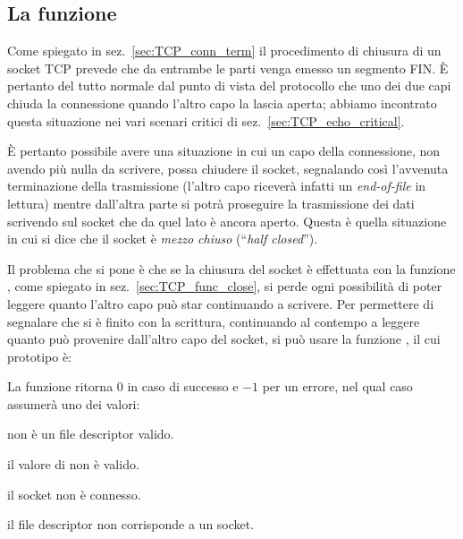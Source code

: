 \subsection{La funzione }
\label{sec:TCP_shutdown}

Come spiegato in sez.~\ref{sec:TCP_conn_term} il procedimento di chiusura di
un socket TCP prevede che da entrambe le parti venga emesso un segmento FIN. È
pertanto del tutto normale dal punto di vista del protocollo che uno dei due
capi chiuda la connessione quando l'altro capo la lascia aperta; abbiamo
incontrato questa situazione nei vari scenari critici di
sez.~\ref{sec:TCP_echo_critical}.


È pertanto possibile avere una situazione in cui un capo della connessione,
non avendo più nulla da scrivere, possa chiudere il socket, segnalando così
l'avvenuta terminazione della trasmissione (l'altro capo riceverà infatti un
\textit{end-of-file} in lettura) mentre dall'altra parte si potrà proseguire
la trasmissione dei dati scrivendo sul socket che da quel lato è ancora
aperto.  Questa è quella situazione in cui si dice che il socket è
\textsl{mezzo chiuso} (``\textit{half closed}'').

Il problema che si pone è che se la chiusura del socket è effettuata con la
funzione , come spiegato in sez.~\ref{sec:TCP_func_close}, si
perde ogni possibilità di poter leggere quanto l'altro capo può star
continuando a scrivere. Per permettere di segnalare che si è finito con la
scrittura, continuando al contempo a leggere quanto può provenire dall'altro
capo del socket, si può usare la funzione , il cui prototipo
è:

\begin{funcproto}{
}

{La funzione ritorna $0$ in caso di successo e $-1$ per un errore, nel qual
  caso  assumerà uno dei valori: 
  \begin{errlist}
  \item[\errcode{EBADF}]  non è un file descriptor valido.
  \item[\errcode{EINVAL}] il valore di  non è valido.
  \item[\errcode{ENOTCONN}] il socket non è connesso.
  \item[\errcode{ENOTSOCK}] il file descriptor non corrisponde a un socket.
  \end{errlist}}
\end{funcproto}

